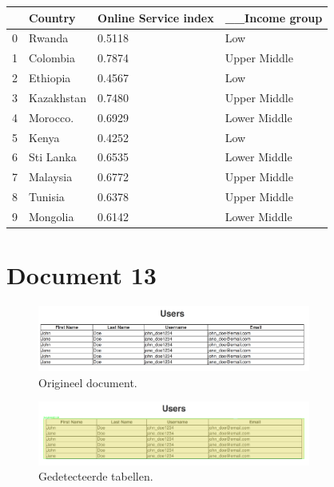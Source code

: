 \begin{tabular}{llll}
\toprule
{} &     Country & Online Service index & \_\_Income group \\
\midrule
0 &      Rwanda &               0.5118 &            Low \\
1 &    Colombia &               0.7874 &   Upper Middle \\
2 &    Ethiopia &               0.4567 &            Low \\
3 &  Kazakhstan &               0.7480 &   Upper Middle \\
4 &    Morocco. &               0.6929 &   Lower Middle \\
5 &       Kenya &               0.4252 &            Low \\
6 &   Sti Lanka &               0.6535 &   Lower Middle \\
7 &    Malaysia &               0.6772 &   Upper Middle \\
8 &     Tunisia &               0.6378 &   Upper Middle \\
9 &    Mongolia &               0.6142 &   Lower Middle \\
\bottomrule
\end{tabular}

\section{Document 13}

\begin{figure}[H]
    \centering
    \includegraphics[width=0.8\textwidth]{test-resultaten/13/original.png}
    \caption{Origineel document.}
\end{figure}

\begin{figure}[H]
    \centering
    \includegraphics[width=0.8\textwidth]{test-resultaten/13/detected_tables.png}
    \caption{Gedetecteerde tabellen.}
\end{figure}


